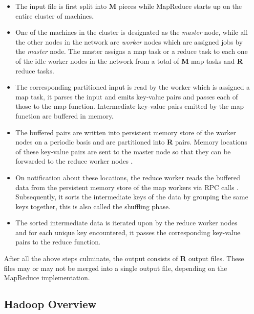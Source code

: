 \begin{itemize}
\item The input file is first split into \textbf{M} pieces while MapReduce starts up on the entire cluster of machines.
\item One of the machines in the cluster is designated as the \textit{master} node, while all the other nodes in the network are \textit{worker} nodes which are assigned jobs by the \textit{master} node. The master assigns a map task or a reduce task to each one of the idle worker nodes in the network from a total of \textbf{M} map tasks and \textbf{R} reduce tasks.
\item The corresponding partitioned input is read by the worker which is assigned a map task, it parses the input and emits key-value pairs and passes each of those to the map function. Intermediate key-value pairs emitted by the map function are buffered in memory.
\item The buffered pairs are written into persistent memory store of the worker nodes on a periodic basis and are partitioned into \textbf{R} pairs. Memory locations of these key-value pairs are sent to the master node so that they can be forwarded to the reduce worker nodes \cite{dean2008mapreduce}.
\item On notification about these locations, the reduce worker reads the buffered data from the persistent memory store of the map workers via RPC calls \cite{dean2008mapreduce}. Subsequently, it sorts the intermediate keys of the data by grouping the same keys together, this is also called the shuffling phase. 
\item  The sorted intermediate data is iterated upon by the reduce worker nodes and for each unique key encountered, it passes the corresponding key-value pairs to the reduce function. 
\end{itemize}

After all the above steps culminate, the output consists of \textbf{R} output files. These files may or may not be merged into a single output file, depending on the MapReduce implementation. 

\subsection{Hadoop Overview} \label{subsec:HadoopOverview}

